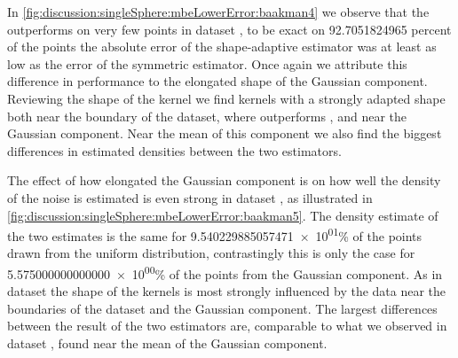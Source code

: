 		In \cref{fig:discussion:singleSphere:mbeLowerError:baakman4} we observe that the \mbe outperforms \sambe on very few points in dataset \baakmanFour, to be exact on \num{92.7051824965} percent of the points the absolute error of the shape-adaptive estimator was at least as low as the error of the symmetric estimator. Once again we attribute this difference in performance to the elongated shape of the Gaussian component. 
		Reviewing the shape of the kernel we find kernels with a strongly adapted shape both near the boundary of the dataset, where \sambe outperforms \mbe, and near the Gaussian component.
		Near the mean of this component we also find the biggest differences in estimated densities between the two estimators. 






		The effect of how elongated the Gaussian component is on how well the density of the noise is estimated is even strong in dataset \baakmanFive, as illustrated in \cref{fig:discussion:singleSphere:mbeLowerError:baakman5}. The density estimate of the two estimates is the same for \num{9.540229885057471e+01}\% of the points drawn from the uniform distribution, contrastingly this is only the case for \num{5.575000000000000e+00}\% of the points from the Gaussian component. 
		As in dataset \baakmanFour the shape of the kernels is most strongly influenced by the data near the boundaries of the dataset and the Gaussian component.
		The largest differences between the result of the two estimators are, comparable to what we observed in dataset \baakmanFour, found near the mean of the Gaussian component. 

